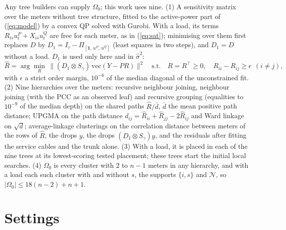 \documentclass[journal,onecolumn,11pt]{IEEEtran}
\newcommand{\tp}{^{\top}}
\newcommand{\one}{\mathbf{1}}
\newcommand{\Nset}{\mathcal{N}}
\begin{document}
Any tree builders can supply $\Omega_0$; this work uses nine. (1) A sensitivity matrix over the meters without tree structure, fitted to the
active-power part of (\ref{eq:model}) by a convex QP solved with Gurobi. With a load, its terms $R_{is}u^P_t+X_{is}u^Q_t$ are
free for each meter, as in (\ref{eq:sat}); minimising over them first replaces $D$ by $D_1=I_\tau-\Pi_{[\one,\,u^P,\,u^Q]}$
(least squares in two steps), and $D_1=D$ without a load. $D_1$ is used only here and in $\hat\sigma^2$:
\begin{equation}\label{eq:rhat}
\hat R=\arg\min_R\ \big\|(D_1\otimes S_\gamma)\,\mathrm{vec}(Y-PR)\big\|^2\quad\text{s.t.}\quad R=R\tp\ge0,\quad
R_{ii}-R_{ij}\ge\epsilon\ \ (i\ne j),
\end{equation}
with $\epsilon$ a strict order margin, $10^{-6}$ of the median diagonal of the unconstrained fit.
(2) Nine hierarchies over the meters: recursive neighbour joining, neighbour joining (with the PCC as an observed leaf) and
recursive grouping (equalities to $10^{-9}$ of the median depth) on the shared paths $\hat R/\bar d$, $\bar d$ the mean
positive path distance;
UPGMA on the path distance $d_{ij}=\hat R_{ii}+\hat R_{jj}-2\hat R_{ij}$ and Ward linkage on $\sqrt d$; average-linkage
clusterings on the correlation distance between meters of the rows of $\hat R$, the drops $y$, the drops
$(D_1\otimes S_\gamma)y$, and the residuals after fitting the service cables and the trunk alone. (3) With a load, it is placed in each of
the nine trees at its lowest-scoring tested placement; these trees start the initial local searches. (4) $\Omega_0$ is every cluster with 2 to
$n-1$ meters in any hierarchy, and with a load each such cluster with and without $s$, the supports $\{i,s\}$ and $\Nset$,
so $|\Omega_0|\le18(n-2)+n+1$.

\section{Settings}
\end{document}
